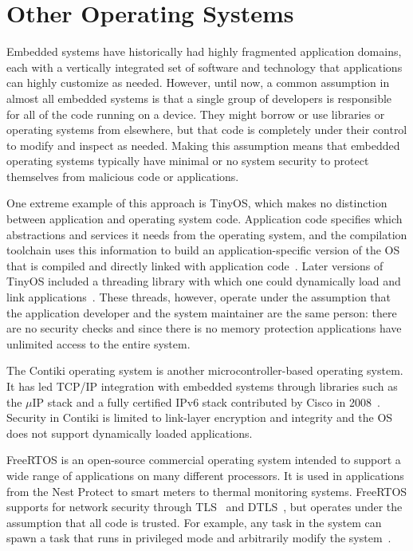 \section{Other Operating Systems}

Embedded systems have historically had highly fragmented application domains,
each with a vertically integrated set of software and technology that
applications can highly customize as needed. However, until now, a common
assumption in almost all embedded systems is that a single group of developers
is responsible for all of the code running on a device. They might borrow
or use libraries or operating systems from elsewhere, but that code is 
completely under their control to modify and inspect as needed. Making
this assumption means that embedded operating systems typically have
minimal or no system security to protect themselves from malicious code
or applications.

One extreme example of this approach is TinyOS, which makes no
distinction between application and operating system code. Application
code specifies which abstractions and services it needs from the
operating system, and the compilation toolchain uses this information
to build an application-specific version of the OS that is compiled
and directly linked with application code~\cite{tinyos}. Later
versions of TinyOS included a threading library with which one could
dynamically load and link applications~\cite{tosthreads}. These
threads, however, operate under the assumption that the application
developer and the system maintainer are the same person: there are no
security checks and since there is no memory protection applications
have unlimited access to the entire system.

The Contiki operating system is another microcontroller-based
operating system. It has led TCP/IP integration with embedded systems
through libraries such as the $\mu$IP stack and a fully
certified IPv6 stack contributed by Cisco in 2008~\cite{contiki}. 
Security in Contiki is limited to
link-layer encryption and integrity and the OS does not support
dynamically loaded applications.

FreeRTOS is an open-source commercial operating system intended to 
support a wide range of applications on many different processors. It
is used in applications from the Nest Protect to smart meters to
thermal monitoring systems. FreeRTOS supports for network security
through TLS~\cite{tls} and DTLS~\cite{dtls}, but operates under the
assumption that all code is trusted. For example, any task in the system
can spawn a task that runs in privileged mode and arbitrarily modify
the system~\cite{rtos-tasks,rtos-sec}.

